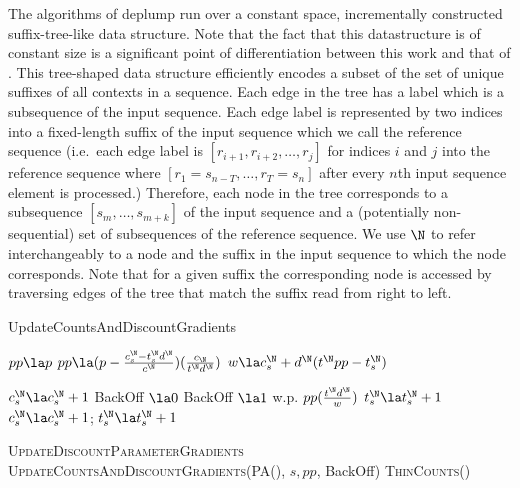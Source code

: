 The algorithms of deplump run over a constant space, incrementally constructed suffix-tree-like data structure.  Note that the fact that this datastructure is of constant size is a significant point of  differentiation between this work and that of \cite{Gasthaus2010}. This tree-shaped data structure efficiently encodes a subset of the set of unique suffixes of all contexts in a sequence.  Each edge in the tree has a label which is a subsequence of the input sequence.  Each edge label is represented by two indices into a fixed-length suffix of the input sequence which we call the reference sequence (i.e.~each edge label is $[r_{i+1}, r_{i+2}, \ldots,r_{j}]$ for indices $i$ and $j$ into the reference sequence where $[r_{1} = s_{n-T}, \ldots, r_T = s_n]$ after every $n$th input sequence element is processed.)  
Therefore, each node in the tree corresponds to a subsequence $[s_m, \ldots, s_{m + k}]$ of the input sequence and a (potentially non-sequential) set of subsequences of the reference sequence.  
We use $\N$ to refer interchangeably to a node and the suffix in the input sequence to which the node corresponds.  Note that for a given suffix the corresponding node is accessed by traversing edges of the tree that match the suffix read from right to left. 
\begin{algorithm}[t!]
	\caption{UpdateCountsAndDiscountGradients} \label{alg:updatecountsandgradients}
	\begin{algorithmic}[1]
	
		\State $pp \la p$
			\State $pp \la (p - \frac{c^\N_s - t^\N_s d^{\N}}{c^\N})(\frac{c_\N}{t^\N d^{\N}})$
			\State $w \la c^\N_s	+ d^\N (t^\N pp   - t^\N_s)$		
		\EndIf
		
			\State $c^\N_s \la c^\N_s + 1$
			\State BackOff $\la 0$
			\State BackOff $\la 1$ w.p. $pp (\frac{t^\N d^{\N}}{w})$ 
				\State $t^\N_s \la t^\N_s + 1$
			 \EndIf
				\State $c^\N_s \la c^\N_s + 1$;  $t^\N_s \la t^\N_s + 1$
		\EndIf
		
		\State \textsc{UpdateDiscountParameterGradients}%
		\State \textsc{UpdateCountsAndDiscountGradients}(\textsc{PA}(\N), $s,pp$, BackOff)
		\State \textsc{ThinCounts}(\N)
	\EndFunction
		\end{algorithmic}
\end{algorithm}

